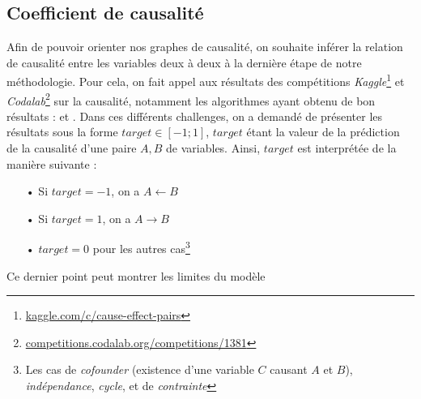 \documentclass[11pt,fleqn,a4paper,openany,frenchb]{book} %
\begin{document}
\subsection{Coefficient de causalité}
Afin de pouvoir orienter nos graphes de causalité, on souhaite inférer la relation de causalité entre les variables deux à deux à la dernière étape de notre méthodologie. Pour cela, on fait appel aux résultats des compétitions \textit{Kaggle}\footnote{\href{https://www.kaggle.com/c/cause-effect-pairs}{kaggle.com/c/cause-effect-pairs}} et \textit{Codalab}\footnote{\href{https://competitions.codalab.org/competitions/1381}{competitions.codalab.org/competitions/1381}} sur la causalité, notamment les algorithmes ayant obtenu de bon résultats : \cite{follonosa2016causalityvar} et \cite{lopez-paz2015learningcausality}. Dans ces différents challenges, on a demandé de présenter les résultats sous la forme $target \in [-1;1]$, $target$ étant la valeur de la prédiction de la causalité d'une paire $A,B$ de variables. Ainsi, $target$ est interprétée de la manière suivante : 
\begin{itemize}
\item[•] Si $target = -1$, on a $A\leftarrow B$
\item[•] Si $target = 1$, on a $A\rightarrow B$
\item[•] $target = 0$ pour les autres cas\footnote{Les cas de \textit{cofounder} (existence d'une variable $C$ causant $A$ et $B$), \textit{indépendance}, \textit{cycle}, et de \textit{contrainte}}\vspace{0.3cm}
\end{itemize}
Ce dernier point peut montrer les limites du modèle



%
%





\listoffigures
{}

\listoftables
{}
\vfill
\end{document}
